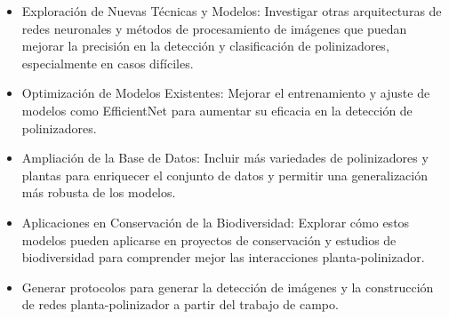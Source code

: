 \begin{itemize}
\item 
    Exploración de Nuevas Técnicas y Modelos: Investigar otras arquitecturas de redes neuronales y métodos de procesamiento de imágenes que puedan mejorar la precisión en la detección y clasificación de polinizadores, especialmente en casos difíciles.
\item 
    Optimización de Modelos Existentes: Mejorar el entrenamiento y ajuste de modelos como EfficientNet para aumentar su eficacia en la detección de polinizadores.
\item 
    Ampliación de la Base de Datos: Incluir más variedades de polinizadores y plantas para enriquecer el conjunto de datos y permitir una generalización más robusta de los modelos.
\item 
    Aplicaciones en Conservación de la Biodiversidad: Explorar cómo estos modelos pueden aplicarse en proyectos de conservación y estudios de biodiversidad para comprender mejor las interacciones planta-polinizador.
\item 
    Generar protocolos para generar la detección de imágenes y la construcción de redes planta-polinizador a partir del trabajo de campo.
\end{itemize}